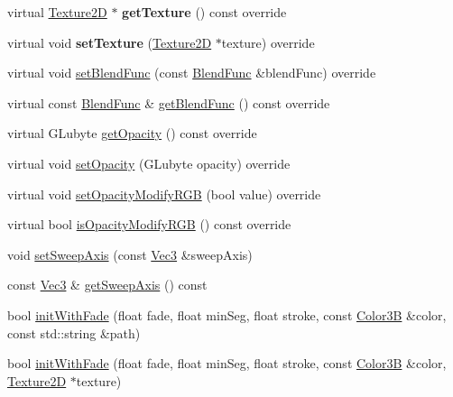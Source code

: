 \begin{DoxyCompactItemize}
\mbox{\label{classMotionStreak3D_a8a93b8b940b06d118b4aec02e8cdca24}} 
virtual \hyperlink{classTexture2D}{Texture2D} $\ast$ {\bfseries get\+Texture} () const override
\item 
\mbox{\label{classMotionStreak3D_a2e996a9c0ba2badb8aa9a66db579d3c7}} 
virtual void {\bfseries set\+Texture} (\hyperlink{classTexture2D}{Texture2D} $\ast$texture) override
\item 
virtual void \hyperlink{classMotionStreak3D_a80ee5d8b98847fff388cff81997818d0}{set\+Blend\+Func} (const \hyperlink{structBlendFunc}{Blend\+Func} \&blend\+Func) override
\item 
virtual const \hyperlink{structBlendFunc}{Blend\+Func} \& \hyperlink{classMotionStreak3D_a9d57c6213ec8145cd4e3ac9bb9c65ba0}{get\+Blend\+Func} () const override
\item 
virtual G\+Lubyte \hyperlink{classMotionStreak3D_aae52587b7c2cb5833f133b40add6a860}{get\+Opacity} () const override
\item 
virtual void \hyperlink{classMotionStreak3D_aaf983644b09cefdf815a650c7cfd426a}{set\+Opacity} (G\+Lubyte opacity) override
\item 
virtual void \hyperlink{classMotionStreak3D_ad201e04b841b5fb15fea56bfd6b9cb03}{set\+Opacity\+Modify\+R\+GB} (bool value) override
\item 
virtual bool \hyperlink{classMotionStreak3D_a5de4e2e686f06acfecf86fc7b7caed6e}{is\+Opacity\+Modify\+R\+GB} () const override
\item 
void \hyperlink{classMotionStreak3D_a1d9e11935a4992f5c475d13d955c6578}{set\+Sweep\+Axis} (const \hyperlink{classVec3}{Vec3} \&sweep\+Axis)
\item 
const \hyperlink{classVec3}{Vec3} \& \hyperlink{classMotionStreak3D_aa6cd925496130156b4aadf09bcfc9b32}{get\+Sweep\+Axis} () const
\item 
bool \hyperlink{classMotionStreak3D_aeb508d5a9a772ca2f87a195a92631501}{init\+With\+Fade} (float fade, float min\+Seg, float stroke, const \hyperlink{structColor3B}{Color3B} \&color, const std\+::string \&path)
\item 
bool \hyperlink{classMotionStreak3D_a6b99e3a23ebf47e35f83a9cab843ee9d}{init\+With\+Fade} (float fade, float min\+Seg, float stroke, const \hyperlink{structColor3B}{Color3B} \&color, \hyperlink{classTexture2D}{Texture2D} $\ast$texture)
\end{DoxyCompactItemize}
